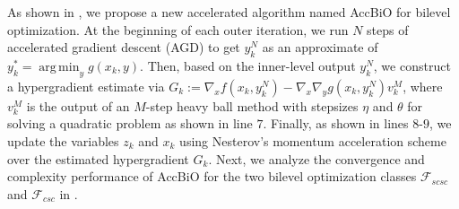 \documentclass{osudissert96}
\DeclareMathOperator*{\argmin}{arg\,min}
\begin{document}
As shown in , we propose a new accelerated algorithm named AccBiO for bilevel optimization.  
At the beginning of each outer iteration, we run $N$ steps of accelerated gradient descent (AGD) to get $y_k^N$ as an approximate of $y_k^*=\argmin_y g(x_k,y)$. Then, based on the inner-level output $y_k^N$, we construct a hypergradient estimate via $G_k:= \nabla_x f(x_k,y_k^N) -\nabla_x \nabla_y g(x_k,y_k^N)v_k^M$, where $v_k^M$ is 
  the output of an $M$-step heavy ball method with stepsizes $\eta$ and $\theta$ for solving a quadratic problem as shown in line $7$. Finally, as shown in lines $8$-$9$, we update the variables $z_{k}$ and $x_k$  using  Nesterov's momentum acceleration scheme~\cite{nesterov2018lectures} over the estimated hypergradient $G_k$.
  Next, we analyze  the convergence and complexity performance of AccBiO for the two bilevel optimization classes $\mathcal{F}_{scsc}$ and $\mathcal{F}_{csc}$ in .
\end{document}
